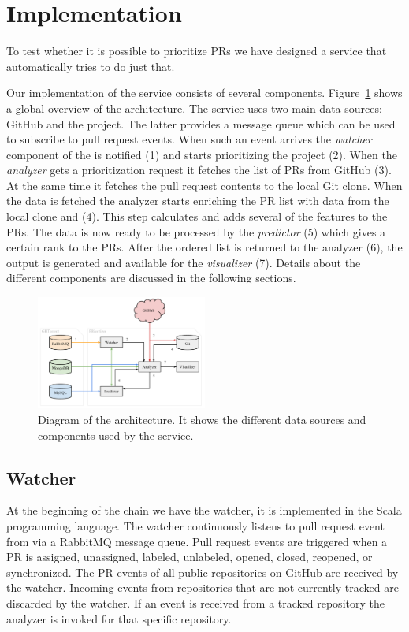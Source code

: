 \documentclass[conference]{IEEEtran}
\begin{document}
\section{Implementation}
\label{sec:implementation}

To test whether it is possible to prioritize PRs we have designed a service that automatically tries to do just that.

Our implementation of the service consists of several components.
Figure~\ref{fig:architecture} shows a global overview of the architecture.
The \prioritizer service uses two main data sources: GitHub and the \ghtorrent project.
The latter provides a message queue which can be used to subscribe to pull request events.
When such an event arrives the \emph{watcher} component of the \prioritizer is notified (1) and starts prioritizing the project (2).
When the \emph{analyzer} gets a prioritization request it fetches the list of PRs from GitHub (3).
At the same time it fetches the pull request contents to the local Git clone.
When the data is fetched the analyzer starts enriching the PR list with data from the local clone and \ghtorrent (4).
This step calculates and adds several of the features to the PRs.
The data is now ready to be processed by the \emph{predictor} (5) which gives a certain rank to the PRs.
After the ordered list is returned to the analyzer (6), the output is generated and available for the \emph{visualizer} (7).
Details about the different components are discussed in the following sections.

\begin{figure}
  \centering
  \includegraphics[width=0.5\textwidth]{../figs/architecture.pdf}
  \caption[Diagram of the architecture]
   {Diagram of the architecture. It shows the different data sources and components used by the \prioritizer service.}
  \label{fig:architecture}
\end{figure}

\subsection{Watcher}
\label{sec:watcher}
At the beginning of the chain we have the watcher, it is implemented in the Scala programming language.
The watcher continuously listens to pull request event from \ghtorrent via a RabbitMQ message queue.
Pull request events are triggered when a PR is assigned, unassigned, labeled, unlabeled, opened, closed, reopened, or synchronized.
The PR events of all public repositories on GitHub are received by the watcher.
Incoming events from repositories that are not currently tracked are discarded by the watcher.
If an event is received from a tracked repository the analyzer is invoked for that specific repository.
\end{document}
